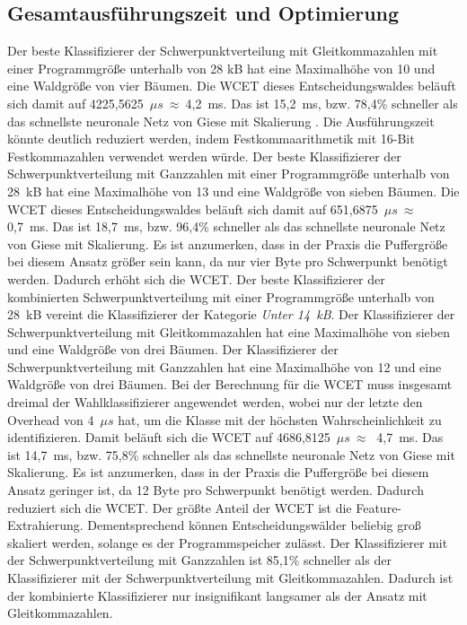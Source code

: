 \subsection{Gesamtausführungszeit und Optimierung}
Der beste Klassifizierer der Schwerpunktverteilung mit Gleitkommazahlen mit einer Programmgröße unterhalb von 28 kB hat eine Maximalhöhe von 10 und eine Waldgröße von vier Bäumen. Die WCET dieses Entscheidungswaldes
beläuft sich damit auf 4225,5625~$\mu s\ \approx\ $4,2~ms. Das ist 15,2~ms, bzw. 78,4\% schneller als das schnellste neuronale Netz von Giese mit Skalierung \cite{gieseThesis}. Die Ausführungszeit könnte deutlich reduziert
werden, indem Festkommaarithmetik mit 16-Bit Festkommazahlen verwendet werden würde.
\newline
\newline
Der beste Klassifizierer der Schwerpunktverteilung mit Ganzzahlen mit einer Programmgröße unterhalb von 28~kB hat eine Maximalhöhe von 13 und eine Waldgröße von sieben Bäumen. Die WCET dieses Entscheidungswaldes
beläuft sich damit auf 651,6875~$\mu s\ \approx\ $0,7~ms. Das ist 18,7~ms, bzw. 96,4\% schneller als das schnellste neuronale Netz von Giese mit Skalierung. Es ist anzumerken, dass in der Praxis die Puffergröße
bei diesem Ansatz größer sein kann, da nur vier Byte pro Schwerpunkt benötigt werden. Dadurch erhöht sich die WCET.
\newline
\newline
Der beste Klassifizierer der kombinierten Schwerpunktverteilung mit einer Programmgröße unterhalb von 28~kB vereint die Klassifizierer der Kategorie \textit{Unter 14~kB}. Der Klassifizierer der Schwerpunktverteilung
mit Gleitkommazahlen hat eine Maximalhöhe von sieben und eine Waldgröße von drei Bäumen. Der Klassifizierer der Schwerpunktverteilung mit Ganzzahlen hat eine Maximalhöhe von 12 und eine Waldgröße von drei Bäumen. Bei der
Berechnung für die WCET muss insgesamt dreimal der Wahlklassifizierer angewendet werden, wobei nur der letzte den Overhead von 4~$\mu s$ hat, um die Klasse mit der höchsten Wahrscheinlichkeit zu identifizieren. Damit
beläuft sich die WCET auf 4686,8125~$\mu s\ \approx\ $ 4,7~ms. Das ist 14,7~ms, bzw. 75,8\% schneller als das schnellste neuronale Netz von Giese mit Skalierung. Es ist anzumerken, dass in der Praxis die Puffergröße
bei diesem Ansatz geringer ist, da 12 Byte pro Schwerpunkt benötigt werden. Dadurch reduziert sich die WCET.
\newline
\newline
Der größte Anteil der WCET ist die Feature-Extrahierung. Dementsprechend können Entscheidungswälder beliebig groß skaliert werden, solange es der Programmspeicher zulässt. Der Klassifizierer mit der Schwerpunktverteilung
mit Ganzzahlen ist 85,1\% schneller als der Klassifizierer mit der Schwerpunktverteilung mit Gleitkommazahlen. Dadurch ist der kombinierte Klassifizierer nur insignifikant langsamer als der Ansatz mit Gleitkommazahlen.